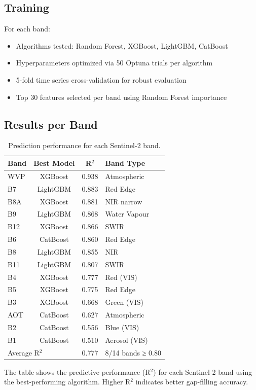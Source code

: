 \documentclass[12pt]{report}
\begin{document}
\subsection{Training}

For each band:
\begin{itemize}
    \item Algorithms tested: Random Forest, XGBoost, LightGBM, CatBoost
    \item Hyperparameters optimized via 50 Optuna trials per algorithm
    \item 5-fold time series cross-validation for robust evaluation
    \item Top 30 features selected per band using Random Forest importance
\end{itemize}

\subsection{Results per Band}
\begin{table}[H]
\centering
\caption{Prediction performance for each Sentinel-2 band.}
\label{tab:s2_band_r2}
\vspace{.3cm}
\begin{tabular}{|l|c|c|l|}
\hline
\textbf{Band} & \textbf{Best Model} & \textbf{R$^2$} & \textbf{Band Type} \\
\hline
WVP  & XGBoost  & 0.938 & Atmospheric \\
\hline
B7   & LightGBM & 0.883 & Red Edge \\
\hline
B8A  & XGBoost  & 0.881 & NIR narrow \\
\hline
B9   & LightGBM & 0.868 & Water Vapour \\
\hline
B12  & XGBoost  & 0.866 & SWIR \\
\hline
B6   & CatBoost & 0.860 & Red Edge \\
\hline
B8   & LightGBM & 0.855 & NIR \\
\hline
B11  & LightGBM & 0.807 & SWIR \\
\hline
B4   & XGBoost  & 0.777 & Red (VIS) \\
\hline
B5   & XGBoost  & 0.775 & Red Edge \\
\hline
B3   & XGBoost  & 0.668 & Green (VIS) \\
\hline
AOT  & CatBoost & 0.627 & Atmospheric \\
\hline
B2   & CatBoost & 0.556 & Blue (VIS) \\
\hline
B1   & CatBoost & 0.510 & Aerosol (VIS) \\
\hline
\multicolumn{2}{|l|}{Average R$^2$} & 0.777 & 8/14 bands ≥ 0.80 \\
\hline
\end{tabular}
\par\vspace{0.2cm}
\end{table}
The table shows the predictive performance (R$^2$) for each Sentinel-2 band using the best-performing algorithm. Higher R$^2$ indicates better gap-filling accuracy.
\end{document}
